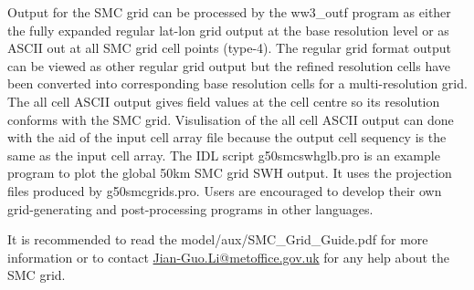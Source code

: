 Output for the SMC grid can be processed by the ww3\_outf program
as either the fully expanded regular lat-lon grid output at the base
resolution level or as ASCII out at all SMC grid cell points (type-4).
The regular grid format output can be viewed as other regular grid
output but the refined resolution cells have been converted into 
corresponding base resolution cells for a multi-resolution grid. 
The all cell ASCII output gives field values at the cell centre
so its resolution conforms with the SMC grid. Visulisation of the
all cell ASCII output can done with the aid of the input cell array
file because the output cell sequency is the same as the input cell
array. The IDL script g50smcswhglb.pro is an example program to plot
the global 50km SMC grid SWH output. It uses the projection files
produced by g50smcgrids.pro. Users are encouraged to develop their
own grid-generating and post-processing programs in other languages.

It is recommended to read the model/aux/SMC\_Grid\_Guide.pdf for
more information or to contact \url{Jian-Guo.Li@metoffice.gov.uk} 
for any help about the SMC grid.

